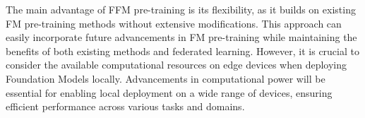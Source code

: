 The main advantage of FFM pre-training is its flexibility, as it builds on existing FM pre-training methods without extensive modifications. This approach can easily incorporate future advancements in FM pre-training while maintaining the benefits of both existing methods and federated learning. However, it is crucial to consider the available computational resources on edge devices when deploying Foundation Models locally. Advancements in computational power will be essential for enabling local deployment on a wide range of devices, ensuring efficient performance across various tasks and domains.




